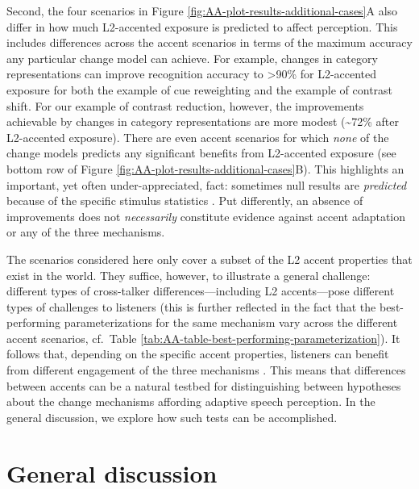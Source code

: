 \documentclass[
  11pt,
  man,floatsintext]{apa6}
\begin{document}
Second, the four scenarios in Figure \ref{fig:AA-plot-results-additional-cases}A also differ in how much L2-accented exposure is predicted to affect perception. This includes differences across the accent scenarios in terms of the maximum accuracy any particular change model can achieve. For example, changes in category representations can improve recognition accuracy to \textgreater90\% for L2-accented exposure for both the example of cue reweighting and the example of contrast shift. For our example of contrast reduction, however, the improvements achievable by changes in category representations are more modest (\textasciitilde72\% after L2-accented exposure). There are even accent scenarios for which \emph{none} of the change models predicts any significant benefits from L2-accented exposure (see bottom row of Figure \ref{fig:AA-plot-results-additional-cases}B). This highlights an important, yet often under-appreciated, fact: sometimes null results are \emph{predicted} because of the specific stimulus statistics \autocites[see][]{tan2021,zheng-samuel2020}. Put differently, an absence of improvements does not \emph{necessarily} constitute evidence against accent adaptation or any of the three mechanisms.

The scenarios considered here only cover a subset of the L2 accent properties that exist in the world. They suffice, however, to illustrate a general challenge: different types of cross-talker differences---including L2 accents---pose different types of challenges to listeners (this is further reflected in the fact that the best-performing parameterizations for the same mechanism vary across the different accent scenarios, cf.~Table \ref{tab:AA-table-best-performing-parameterization}). It follows that, depending on the specific accent properties, listeners can benefit from different engagement of the three mechanisms \autocite[and different rates of adaptation, see discussion of the flexibility-stability trade-off in][180-182]{kleinschmidt-jaeger2015}. This means that differences between accents can be a natural testbed for distinguishing between hypotheses about the change mechanisms affording adaptive speech perception. In the general discussion, we explore how such tests can be accomplished.

\section{General discussion}\label{sec:general-discussion}
\end{document}
